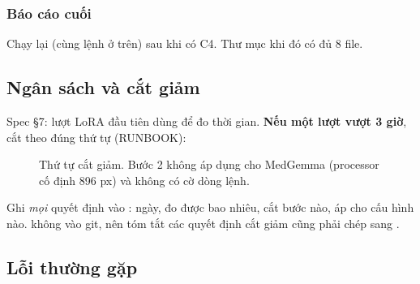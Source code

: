 \subsubsection{Báo cáo cuối}
Chạy lại  (cùng lệnh ở trên) sau khi có C4. Thư mục  khi đó có đủ 8 file.

\subsection{Ngân sách và cắt giảm}
\label{sec:budget}

Spec §7: lượt LoRA đầu tiên dùng để đo thời gian. \textbf{Nếu một lượt vượt 3 giờ}, cắt theo đúng thứ tự (RUNBOOK):

\begin{figure}[H]
\centering
{}
\caption{Thứ tự cắt giảm. Bước 2 không áp dụng cho MedGemma (processor cố định 896 px) và không có cờ dòng lệnh.}
\label{fig:budget}
\end{figure}

Ghi \emph{mọi} quyết định vào : ngày, đo được bao nhiêu, cắt bước nào, áp cho cấu hình nào.
 không vào git, nên tóm tắt các quyết định cắt giảm cũng phải chép sang .

\subsection{Lỗi thường gặp}
\label{sec:errors}

